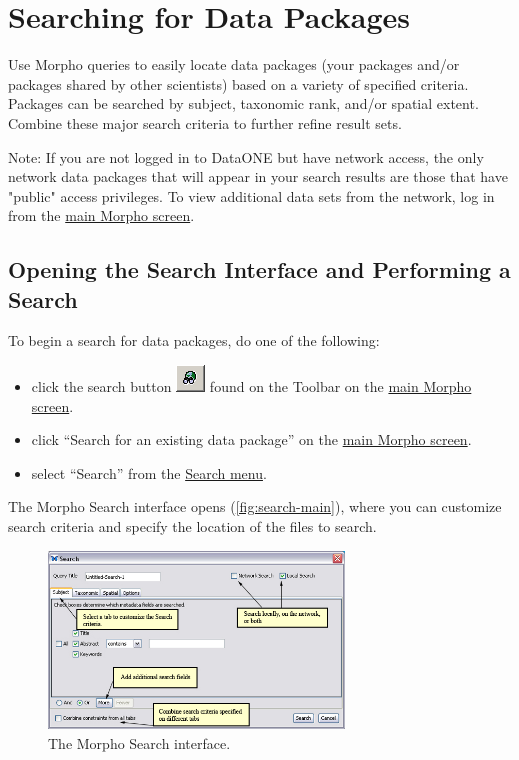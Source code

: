 \section{Searching for Data Packages} \label{sec:searching}

Use Morpho queries to easily locate data packages (your packages and/or
packages shared by other scientists) based on a variety of specified
criteria. Packages can be searched by subject, taxonomic rank, and/or
spatial extent. Combine these major search criteria to further refine
result sets. 

Note: If you are not logged in to DataONE but have network
access, the only network data packages that will appear in your search
results are those that have "public" access privileges. To view
additional data sets from the network, log in
from the \hyperref[sec:main]{main Morpho screen}.

\subsection{Opening the Search Interface and Performing a Search}

To begin a search for data packages, do one of the following:
\begin{itemize}
  \setlength{\parskip}{1pt}
  \item click the search button
    \includegraphics[scale=0.7]{images/button-search.png} found on the
    Toolbar on the \hyperref[sec:main]{main Morpho screen}.
  \item click ``Search for an existing data package'' on the
    \hyperref[sec:main]{main Morpho screen}.
  \item select ``Search'' from the \hyperref[sec:menu-search]{Search
    menu}.
\end{itemize}

The Morpho Search interface opens (\autoref{fig:search-main}), where you
can customize search criteria and specify the location of the files to
search.

\begin{figure}
  \centering
    \includegraphics[width=0.7\textwidth]{images/search-main.jpg}
  \caption{The Morpho Search interface.}
  \label{fig:search-main}
\end{figure}

